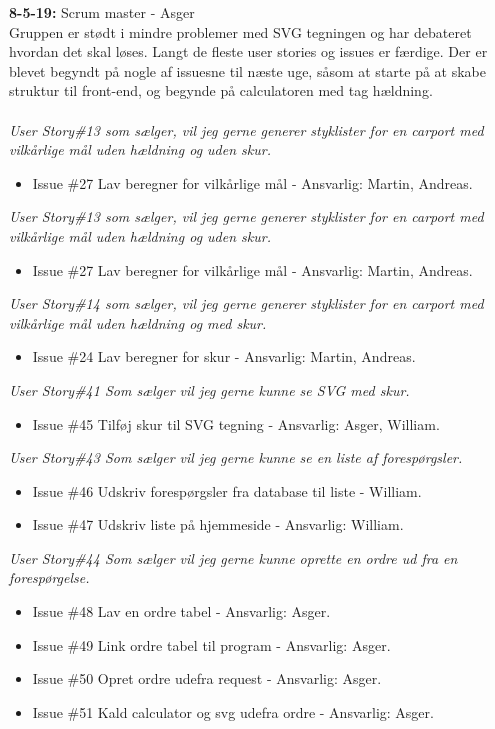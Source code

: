 \documentclass[11pt]{report}
\begin{document}
\noindent\textbf{8-5-19:} Scrum master - Asger\\
Gruppen er stødt i mindre problemer med SVG tegningen og har debateret hvordan det skal løses. Langt de fleste user stories og issues er færdige. Der er blevet begyndt på nogle af issuesne til næste uge, såsom at starte på at skabe struktur til front-end, og begynde på calculatoren med tag hældning.\\\\
\textit{User Story\#13 som sælger, vil jeg gerne generer styklister for en carport med vilkårlige mål uden hældning og uden skur.}
\begin{itemize}
\renewcommand\labelitemi{--}
\item Issue \#27 Lav beregner for vilkårlige mål - Ansvarlig: Martin, Andreas.
\end{itemize}
\textit{User Story\#13 som sælger, vil jeg gerne generer styklister for en carport med vilkårlige mål uden hældning og uden skur.}
\begin{itemize}
\renewcommand\labelitemi{--}
\item Issue \#27 Lav beregner for vilkårlige mål - Ansvarlig: Martin, Andreas.
\end{itemize}
\textit{User Story\#14 som sælger, vil jeg gerne generer styklister for en carport med vilkårlige mål uden hældning og med skur.}
\begin{itemize}
\renewcommand\labelitemi{--}
\item Issue \#24 Lav beregner for skur - Ansvarlig: Martin, Andreas.
\end{itemize}
\textit{User Story\#41 Som sælger vil jeg gerne kunne se SVG med skur.}
\begin{itemize}
\renewcommand\labelitemi{--}
\item Issue \#45 Tilføj skur til SVG tegning - Ansvarlig: Asger, William.
\end{itemize}
\textit{User Story\#43 Som sælger vil jeg gerne kunne se en liste af forespørgsler.}
\begin{itemize}
\renewcommand\labelitemi{--}
\item Issue \#46 Udskriv forespørgsler fra database til liste -
  William.
\item Issue \#47 Udskriv liste på hjemmeside - Ansvarlig: William.
\end{itemize}
\textit{User Story\#44 Som sælger vil jeg gerne kunne oprette en ordre ud fra en forespørgelse.}
\begin{itemize}
\renewcommand\labelitemi{--}
\item Issue \#48  Lav en ordre tabel - Ansvarlig: Asger.
\item Issue \#49 Link ordre tabel til program - Ansvarlig: Asger.
\item Issue \#50 Opret ordre udefra request - Ansvarlig: Asger.
\item Issue \#51 Kald calculator og svg udefra ordre - Ansvarlig: Asger.
\end{itemize}
\end{document}
